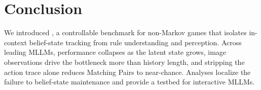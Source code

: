 \section{Conclusion}
\label{sec:conclusion}

We introduced \benchname{}, a controllable benchmark for non-Markov games that isolates in-context belief-state tracking from rule understanding and perception. Across leading MLLMs, performance collapses as the latent state grows, image observations drive the bottleneck more than history length, and stripping the action trace alone reduces Matching Pairs to near-chance. Analyses localize the failure to belief-state maintenance and provide a testbed for interactive MLLMs.